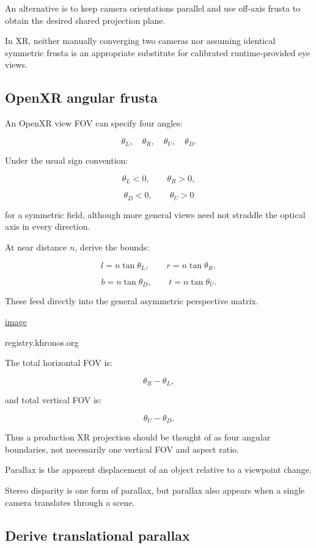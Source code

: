 An alternative is to keep camera orientations parallel and use off-axis frusta to obtain the desired shared projection plane.

In XR, neither manually converging two cameras nor assuming identical symmetric frusta is an appropriate substitute for calibrated runtime-provided eye views.

\subsection{OpenXR angular frusta}\label{02-foundations-ii-ch035-openxr-angular-frusta}

An OpenXR view FOV can specify four angles:

\[ \theta_L,\quad\theta_R,\quad\theta_U,\quad\theta_D. \]

Under the usual sign convention:

\[ \theta_L<0,\qquad\theta_R>0, \]

\[ \theta_D<0,\qquad\theta_U>0 \]

for a symmetric field, although more general views need not straddle the optical axis in every direction.

At near distance \(n\), derive the bounds:

\[ \boxed{ l=n\tan\theta_L,\qquad r=n\tan\theta_R, } \]

\[ \boxed{ b=n\tan\theta_D,\qquad t=n\tan\theta_U. } \]

These feed directly into the general asymmetric perspective matrix. 

\href{https://www.google.com/s2/favicons?domain=https://registry.khronos.org&sz=32}{image}

registry.khronos.org

The total horizontal FOV is:

\[ \theta_R-\theta_L, \]

and total vertical FOV is:

\[ \theta_U-\theta_D. \]

Thus a production XR projection should be thought of as four angular boundaries, not necessarily one vertical FOV and aspect ratio.

Parallax is the apparent displacement of an object relative to a viewpoint change.

Stereo disparity is one form of parallax, but parallax also appears when a single camera translates through a scene.

\subsection{Derive translational parallax}\label{02-foundations-ii-ch035-derive-translational-parallax}

